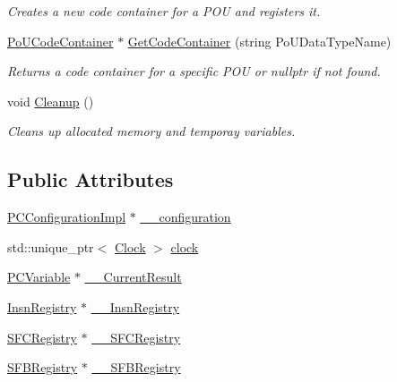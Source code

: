 \begin{DoxyCompactItemize}
\begin{DoxyCompactList}\small\item\em Creates a new code container for a P\+OU and registers it. \end{DoxyCompactList}\item 
\hyperlink{classpc__emulator_1_1PoUCodeContainer}{Po\+U\+Code\+Container} $\ast$ \hyperlink{classpc__emulator_1_1PCResourceImpl_a93b852f67ddca8d086b19a0c7daf7c42}{Get\+Code\+Container} (string Po\+U\+Data\+Type\+Name)\hypertarget{classpc__emulator_1_1PCResourceImpl_a93b852f67ddca8d086b19a0c7daf7c42}{}\label{classpc__emulator_1_1PCResourceImpl_a93b852f67ddca8d086b19a0c7daf7c42}

\begin{DoxyCompactList}\small\item\em Returns a code container for a specific P\+OU or nullptr if not found. \end{DoxyCompactList}\item 
void \hyperlink{classpc__emulator_1_1PCResourceImpl_a3d9ad2276414e07af0a9b435e17faad0}{Cleanup} ()\hypertarget{classpc__emulator_1_1PCResourceImpl_a3d9ad2276414e07af0a9b435e17faad0}{}\label{classpc__emulator_1_1PCResourceImpl_a3d9ad2276414e07af0a9b435e17faad0}

\begin{DoxyCompactList}\small\item\em Cleans up allocated memory and temporay variables. \end{DoxyCompactList}\end{DoxyCompactItemize}
\subsection*{Public Attributes}
\begin{DoxyCompactItemize}
\item 
\hyperlink{classpc__emulator_1_1PCConfigurationImpl}{P\+C\+Configuration\+Impl} $\ast$ \hyperlink{classpc__emulator_1_1PCResourceImpl_a356a5f4a62005c9aee4f6ef8538ced11}{\+\_\+\+\_\+configuration}
\item 
std\+::unique\+\_\+ptr$<$ \hyperlink{classpc__emulator_1_1Clock}{Clock} $>$ \hyperlink{classpc__emulator_1_1PCResourceImpl_ad49b0d4eb79f506f03f37518e1e70d1e}{clock}
\item 
\hyperlink{classpc__emulator_1_1PCVariable}{P\+C\+Variable} $\ast$ \hyperlink{classpc__emulator_1_1PCResourceImpl_a3648237ffd6fc0c0d569b18f7142154f}{\+\_\+\+\_\+\+Current\+Result}
\item 
\hyperlink{classpc__emulator_1_1InsnRegistry}{Insn\+Registry} $\ast$ \hyperlink{classpc__emulator_1_1PCResourceImpl_ac571faf5e66992a7e32996a613278e91}{\+\_\+\+\_\+\+Insn\+Registry}
\item 
\hyperlink{classpc__emulator_1_1SFCRegistry}{S\+F\+C\+Registry} $\ast$ \hyperlink{classpc__emulator_1_1PCResourceImpl_ab0fadc7735b85b999570f02b8543bdab}{\+\_\+\+\_\+\+S\+F\+C\+Registry}
\item 
\hyperlink{classpc__emulator_1_1SFBRegistry}{S\+F\+B\+Registry} $\ast$ \hyperlink{classpc__emulator_1_1PCResourceImpl_affbb704a7c2800fb84b72409b79c7b54}{\+\_\+\+\_\+\+S\+F\+B\+Registry}
\end{DoxyCompactItemize}


